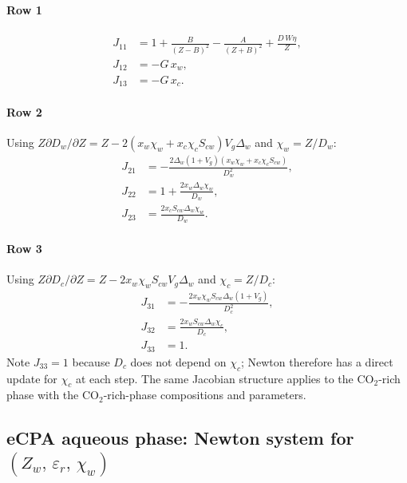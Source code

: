 \documentclass[preprint,12pt,authoryear]{elsarticle}
\begin{document}
\paragraph{Row 1}
\begin{align}
  J_{11} &= 1 + \frac{B}{(Z-B)^2} - \frac{A}{(Z+B)^2} + \frac{D\,W\eta}{Z},
             \label{eq:J11} \\
  J_{12} &= -G\,x_w, \label{eq:J12} \\
  J_{13} &= -G\,x_c. \label{eq:J13}
\end{align}

\paragraph{Row 2}
Using $Z\partial D_w/\partial Z = Z - 2(x_w\chi_w + x_c\chi_c S_{cw})V_g\Delta_w$
and $\chi_w = Z/D_w$:
\begin{align}
  J_{21} &= -\frac{2\Delta_w(1+V_g)(x_w\chi_w + x_c\chi_c S_{cw})}{D_w^2},
             \label{eq:J21} \\
  J_{22} &= 1 + \frac{2x_w\Delta_w\chi_w}{D_w}, \label{eq:J22} \\
  J_{23} &= \frac{2x_c S_{cw}\Delta_w\chi_w}{D_w}. \label{eq:J23}
\end{align}

\paragraph{Row 3}
Using $Z\partial D_c/\partial Z = Z - 2x_w\chi_w S_{cw} V_g\Delta_w$
and $\chi_c = Z/D_c$:
\begin{align}
  J_{31} &= -\frac{2x_w\chi_w S_{cw}\Delta_w(1+V_g)}{D_c^2},
             \label{eq:J31} \\
  J_{32} &= \frac{2x_w S_{cw}\Delta_w\chi_c}{D_c}, \label{eq:J32} \\
  J_{33} &= 1. \label{eq:J33}
\end{align}
Note $J_{33}=1$ because $D_c$ does not depend on $\chi_c$; Newton therefore
has a direct update for $\chi_c$ at each step.
The same Jacobian structure applies to the CO$_2$-rich phase with the
CO$_2$-rich-phase compositions and parameters.

\subsection{eCPA aqueous phase: Newton system for $(Z_w,\,\varepsilon_r,\,\chi_w)$}
\label{sec:jac_ecpa}
\end{document}
